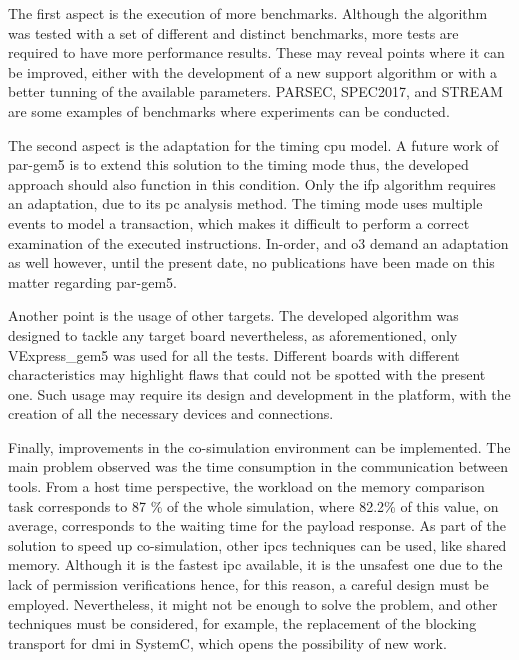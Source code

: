 The first aspect is the execution of more benchmarks. Although the algorithm was tested with a set of different and distinct benchmarks, 
more tests are required to have more performance results. These may reveal points where it can be improved, either with the development
of a new support algorithm or with a better tunning of the available parameters. PARSEC, SPEC2017, and STREAM are some examples of 
benchmarks where experiments can be conducted. 

The second aspect is the adaptation for the timing \gls{cpu} model. A future work of par-gem5 \cite{pargem5} is to extend this solution 
to the timing mode thus, the developed approach should also function in this condition. Only the \gls{ifp} algorithm requires an 
adaptation, due to its \gls{pc} analysis method. The timing mode uses multiple events to model a transaction, which makes it difficult
to perform a correct examination of the executed instructions. In-order, and \gls{o3} demand an adaptation as well however, until 
the present date, no publications have been made on this matter regarding par-gem5.

Another point is the usage of other targets. The developed algorithm was designed to tackle any target board nevertheless, as 
aforementioned, only VExpress\_gem5 was used for all the tests. Different boards with different characteristics may highlight flaws
that could not be spotted with the present one. Such usage may require its design and development in the platform, 
with the creation of all the necessary devices and connections. 

Finally, improvements in the co-simulation environment can be implemented. The main problem observed was the time consumption in the 
communication between tools. From a host time perspective, the workload on the memory comparison task corresponds to 87 \% of the 
whole simulation, where 82.2\% of this value, on average, corresponds to the waiting time for the payload response. As part of the solution
to speed up co-simulation, other \glspl*{ipc} techniques can be used, like shared memory. Although it is the 
fastest \gls{ipc} available, it is the unsafest one due to the lack of permission verifications hence, for this reason, a careful 
design must be employed. Nevertheless, it might not be enough to solve the problem, and other techniques must be considered, for example, 
the replacement of the blocking transport for \gls{dmi} in SystemC, which opens the possibility of new work. 

